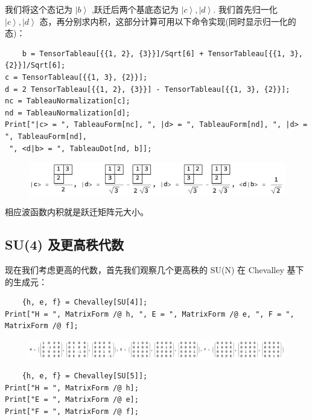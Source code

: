 \documentclass[UTF8]{ctexart}
\begin{document}
\noindent 我们将这个态记为 $\left| b \right \rangle$ ,跃迁后两个基底态记为 $\left| c \right \rangle,\left| d \right \rangle$. 我们首先归一化 $\left| c \right \rangle,\left| d \right \rangle$ 态，再分别求内积，这部分计算可用以下命令实现(同时显示归一化的态)：

\begin{verbatim}
	b = TensorTableau[{{1, 2}, {3}}]/Sqrt[6] + TensorTableau[{{1, 3}, {2}}]/Sqrt[6];
c = TensorTableau[{{1, 3}, {2}}];
d = 2 TensorTableau[{{1, 2}, {3}}] - TensorTableau[{{1, 3}, {2}}];
nc = TableauNormalization[c];
nd = TableauNormalization[d];
Print["|c> = ", TableauForm[nc], ", |d> = ", TableauForm[nd], ", |d> = ", TableauForm[nd],
 ", <d|b> = ", TableauDot[nd, b]];
\end{verbatim}

\begin{figure}[H]
\begin{centering}
\includegraphics[width=0.95\linewidth]{include/O7}
\par\end{centering}
\end{figure}

\noindent 相应波函数内积就是跃迁矩阵元大小。

\subsection*{SU(4) 及更高秩代数}
\noindent 现在我们考虑更高的代数，首先我们观察几个更高秩的 SU(N) 在 Chevalley 基下的生成元：
\begin{verbatim}
	{h, e, f} = Chevalley[SU[4]];
Print["H = ", MatrixForm /@ h, ", E = ", MatrixForm /@ e, ", F = ", MatrixForm /@ f];
\end{verbatim}

\begin{figure}[H]
\begin{centering}
\includegraphics[width=0.95\linewidth]{include/O8}
\par\end{centering}
\end{figure}

\begin{verbatim}
	{h, e, f} = Chevalley[SU[5]];
Print["H = ", MatrixForm /@ h];
Print["E = ", MatrixForm /@ e];
Print["F = ", MatrixForm /@ f];
\end{verbatim}
\end{document}
